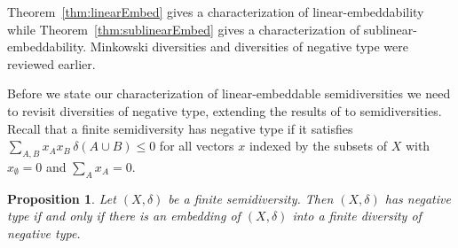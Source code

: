 \documentclass[11pt]{article}
\newtheorem{proposition}[theorem]{Proposition}
\begin{document}
Theorem~\ref{thm:linearEmbed} gives a characterization of linear-embeddability while Theorem~\ref{thm:sublinearEmbed} gives a characterization of sublinear-embeddability. Minkowski diversities and diversities of negative type were reviewed earlier.  

Before we state our characterization of linear-embeddable semidiversities we need to revisit diversities of negative type, extending the results of \cite{WuBryantEtal19} to semidiversities.
Recall that a finite semidiversity has negative type if it satisfies $\sum_{A,B} x_A x_B\, \delta(A \cup B) \leq 0$ for all vectors $x$ indexed by the subsets of $X$ with $x_\emptyset = 0$ and $\sum_A x_A = 0$. 

\begin{proposition} \label{prop:negtype_properties}
Let $(X,\delta)$ be a finite semidiversity. Then $(X,\delta)$ has negative type if and only if there is an embedding of $(X,\delta)$ into a finite diversity of negative type.
\end{proposition}
\end{document}
